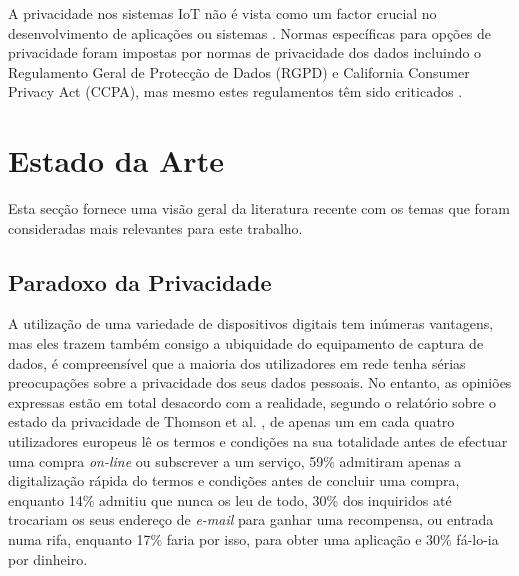 \documentclass[conference]{IEEEtran}
\begin{document}
A privacidade nos sistemas IoT não é vista como um factor crucial no desenvolvimento
de aplicações ou sistemas \cite{alhirabi2021security}. Normas específicas
para opções de privacidade foram impostas por normas de privacidade dos dados
incluindo o Regulamento Geral de Protecção de Dados (RGPD) e California Consumer
Privacy Act (CCPA), mas mesmo estes regulamentos têm sido criticados \cite{peloquin2020disruptive, gladis2022weaponizing, gentile2022deficient, green2022flaws, byun2019privacy}.


\section{Estado da Arte}

\par
Esta secção fornece uma visão geral da literatura recente com os temas que
foram consideradas mais relevantes para este trabalho.


\subsection{Paradoxo da Privacidade}

A utilização de uma variedade de dispositivos digitais tem inúmeras vantagens,
mas eles trazem também consigo a ubiquidade do equipamento de captura de dados,
é compreensível que a maioria dos utilizadores em rede tenha sérias preocupações
sobre a privacidade dos seus dados pessoais. No entanto, as opiniões expressas
estão em total desacordo com a realidade, segundo o relatório sobre o estado
da privacidade de Thomson et al. \cite{DarrenState}, de apenas um em cada
quatro utilizadores europeus lê os termos e condições na sua totalidade antes
de efectuar uma compra \textit{on-line} ou subscrever a um serviço, 59\% admitiram
apenas a digitalização rápida do termos e condições antes de concluir uma
compra, enquanto 14\% admitiu que nunca os leu de todo, 30\% dos inquiridos
até trocariam os seus endereço de \textit{e-mail} para ganhar uma recompensa,
ou entrada numa rifa, enquanto 17\% faria por isso, para obter uma aplicação
e 30\% fá-lo-ia por dinheiro.
\end{document}
